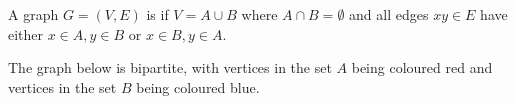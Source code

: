 \documentclass[a4paper]{scrreprt}
\begin{document}
\begin{definition}
	A graph $G = (V, E)$ is  if $V = A \cup B$ where $A \cap B = \emptyset$ and all edges $xy \in E$ have either $x \in A, y \in B$ or $x \in B, y \in A$.
\end{definition}

\begin{example}
	The graph below is bipartite, with vertices in the set $A$ being coloured red and vertices in the set $B$ being coloured blue.
	\begin{center}
		


\begin{tikzpicture}[x=0.75pt,y=0.75pt,yscale=-1,xscale=1]


\end{tikzpicture}
\end{center}
\end{example}
\end{document}
